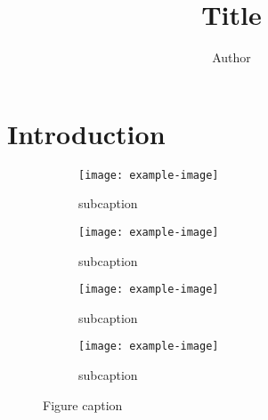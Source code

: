 \documentclass{article}
\begin{document}
\title{Title}
\author{Author}
\maketitle
\begin{abstract}
    \lipsum[1]
\end{abstract}

\section{Introduction}

\begin{figure*}[!ht]
    \begin{subfigure}[h]{0.4\linewidth}
        \texttt{[image: example-image]}
        \caption{subcaption}
    \end{subfigure}\hfill
    \begin{subfigure}[h]{0.4\linewidth}
        \texttt{[image: example-image]}
        \caption{subcaption}
    \end{subfigure}\hfill
    \begin{subfigure}[h]{0.4\linewidth}
        \texttt{[image: example-image]}
        \caption{subcaption}
    \end{subfigure}\hfill
    \begin{subfigure}[h]{0.4\linewidth}
        \texttt{[image: example-image]}
        \caption{subcaption}
    \end{subfigure}\hfill
    \caption{Figure caption}
\end{figure*}

\lipsum \citep{batra2022Machine}



\end{document}
